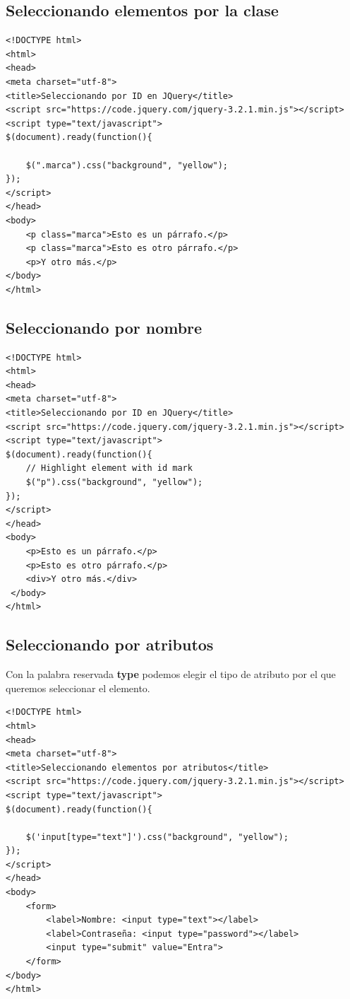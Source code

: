 \documentclass[a4paper, oneside]{article}
\begin{document}
\subsection{Seleccionando elementos por la clase}
\label{sec:org114013d}

\begin{verbatim}
<!DOCTYPE html>
<html>
<head>
<meta charset="utf-8">
<title>Seleccionando por ID en JQuery</title>
<script src="https://code.jquery.com/jquery-3.2.1.min.js"></script>
<script type="text/javascript">
$(document).ready(function(){

    $(".marca").css("background", "yellow");
});
</script> 
</head>
<body>
    <p class="marca">Esto es un párrafo.</p>
    <p class="marca">Esto es otro párrafo.</p>
    <p>Y otro más.</p>
</body>
</html>                                		
\end{verbatim}

\subsection{Seleccionando por nombre}
\label{sec:org4c5541e}

\begin{verbatim}
<!DOCTYPE html>
<html>
<head>
<meta charset="utf-8">
<title>Seleccionando por ID en JQuery</title>
<script src="https://code.jquery.com/jquery-3.2.1.min.js"></script>
<script type="text/javascript">
$(document).ready(function(){
    // Highlight element with id mark
    $("p").css("background", "yellow");
});
</script> 
</head>
<body>
    <p>Esto es un párrafo.</p>
    <p>Esto es otro párrafo.</p>
    <div>Y otro más.</div>
 </body>
</html>                                		
\end{verbatim}

\subsection{Seleccionando por atributos}
\label{sec:org0a4edf0}

Con la palabra reservada \textbf{type} podemos elegir el tipo de atributo por el que queremos seleccionar el elemento.


\begin{verbatim}
<!DOCTYPE html>
<html>
<head>
<meta charset="utf-8">
<title>Seleccionando elementos por atributos</title>
<script src="https://code.jquery.com/jquery-3.2.1.min.js"></script>
<script type="text/javascript">
$(document).ready(function(){

    $('input[type="text"]').css("background", "yellow");
});
</script>
</head>
<body>
    <form>
        <label>Nombre: <input type="text"></label>
        <label>Contraseña: <input type="password"></label>
        <input type="submit" value="Entra">
    </form>
</body>
</html>       
\end{verbatim}
\end{document}
